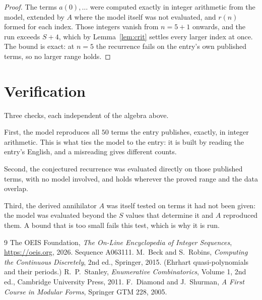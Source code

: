 \documentclass[11pt,a4paper]{article}
\theoremstyle{plain}
\theoremstyle{definition}
\begin{document}
\begin{proof}
The terms $a(0),\dots$ were computed exactly in integer arithmetic from the model, extended by
$A$ where the model itself was not evaluated, and $r(n)$ formed for each index. Those integers
vanish from $n=5+1$ onwards, and the run exceeds $S+4$, which by
Lemma~\ref{lem:crit} settles every larger index at once. The bound is exact: at $n=5$ the recurrence fails on the entry's own published terms, so no larger range holds.
\end{proof}

\section{Verification}

Three checks, each independent of the algebra above.

First, the model reproduces all $50$ terms the entry publishes, exactly, in integer
arithmetic. This is what ties the model to the entry: it is built by reading the entry's
English, and a misreading gives different counts.

Second, the conjectured recurrence was evaluated directly on those published terms, with no
model involved, and holds wherever the proved range and the data overlap.

Third, the derived annihilator $A$ was itself tested on terms it had not been given: the model
was evaluated beyond the $S$ values that determine it and $A$ reproduced them. A bound that is
too small fails this test, which is why it is run.

\begin{thebibliography}{9}
 The OEIS Foundation, \emph{The On-Line Encyclopedia of Integer
Sequences}, \url{https://oeis.org}, 2026. Sequence A063111.
 M.~Beck and S.~Robins, \emph{Computing the Continuous Discretely},
2nd ed., Springer, 2015. (Ehrhart quasi-polynomials and their periods.)
 R.~P.~Stanley, \emph{Enumerative Combinatorics}, Volume 1, 2nd ed.,
Cambridge University Press, 2011.
 F.~Diamond and J.~Shurman, \emph{A First Course in Modular Forms},
Springer GTM 228, 2005.
\end{thebibliography}
\end{document}

